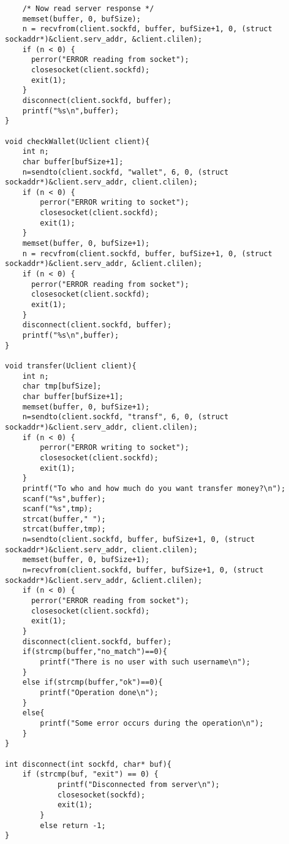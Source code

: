 \documentclass[12pt,a4paper]{report}
\begin{document}
\begin{lstlisting}
    /* Now read server response */
    memset(buffer, 0, bufSize);
	n = recvfrom(client.sockfd, buffer, bufSize+1, 0, (struct sockaddr*)&client.serv_addr, &client.clilen);    
    if (n < 0) {
      perror("ERROR reading from socket");
      closesocket(client.sockfd);
      exit(1);
    }
    disconnect(client.sockfd, buffer);
    printf("%s\n",buffer);
}

void checkWallet(Uclient client){
    int n;
    char buffer[bufSize+1];
    n=sendto(client.sockfd, "wallet", 6, 0, (struct sockaddr*)&client.serv_addr, client.clilen);
    if (n < 0) {
        perror("ERROR writing to socket");
        closesocket(client.sockfd);
        exit(1);
    }
	memset(buffer, 0, bufSize+1);
    n = recvfrom(client.sockfd, buffer, bufSize+1, 0, (struct sockaddr*)&client.serv_addr, &client.clilen);    
    if (n < 0) {
      perror("ERROR reading from socket");
      closesocket(client.sockfd);
      exit(1);
    }
    disconnect(client.sockfd, buffer);
    printf("%s\n",buffer);
}

void transfer(Uclient client){
    int n;
    char tmp[bufSize];
    char buffer[bufSize+1];
    memset(buffer, 0, bufSize+1);
    n=sendto(client.sockfd, "transf", 6, 0, (struct sockaddr*)&client.serv_addr, client.clilen);
    if (n < 0) {
        perror("ERROR writing to socket");
        closesocket(client.sockfd);
        exit(1);
    }
    printf("To who and how much do you want transfer money?\n");
    scanf("%s",buffer);
    scanf("%s",tmp);
    strcat(buffer," ");
    strcat(buffer,tmp);
    n=sendto(client.sockfd, buffer, bufSize+1, 0, (struct sockaddr*)&client.serv_addr, client.clilen);
    memset(buffer, 0, bufSize+1);
    n=recvfrom(client.sockfd, buffer, bufSize+1, 0, (struct sockaddr*)&client.serv_addr, &client.clilen);
    if (n < 0) {
      perror("ERROR reading from socket");
      closesocket(client.sockfd);
      exit(1);
    }
    disconnect(client.sockfd, buffer);
    if(strcmp(buffer,"no_match")==0){
        printf("There is no user with such username\n");
    }
    else if(strcmp(buffer,"ok")==0){
        printf("Operation done\n");
    }
    else{
        printf("Some error occurs during the operation\n");
    }
}

int disconnect(int sockfd, char* buf){
    if (strcmp(buf, "exit") == 0) {
            printf("Disconnected from server\n");
            closesocket(sockfd);
            exit(1);
        }
        else return -1;
}


\end{lstlisting}
\end{document}
